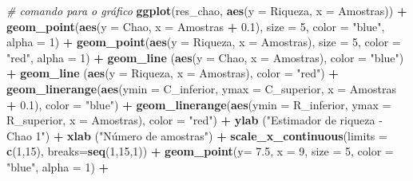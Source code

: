 \documentclass[
]{book}
\newenvironment{Shaded}{\begin{snugshade}}{\end{snugshade}}
\newcommand{\CommentTok}[1]{\textcolor[rgb]{0.56,0.35,0.01}{\textit{#1}}}
\newcommand{\DataTypeTok}[1]{\textcolor[rgb]{0.13,0.29,0.53}{#1}}
\newcommand{\DecValTok}[1]{\textcolor[rgb]{0.00,0.00,0.81}{#1}}
\newcommand{\FloatTok}[1]{\textcolor[rgb]{0.00,0.00,0.81}{#1}}
\newcommand{\KeywordTok}[1]{\textcolor[rgb]{0.13,0.29,0.53}{\textbf{#1}}}
\newcommand{\NormalTok}[1]{#1}
\newcommand{\OperatorTok}[1]{\textcolor[rgb]{0.81,0.36,0.00}{\textbf{#1}}}
\newcommand{\StringTok}[1]{\textcolor[rgb]{0.31,0.60,0.02}{#1}}
\begin{document}
\begin{Shaded}
\begin{Highlighting}[]
\CommentTok{# comando para o gráfico}
\KeywordTok{ggplot}\NormalTok{(res_chao, }\KeywordTok{aes}\NormalTok{(}\DataTypeTok{y =}\NormalTok{ Riqueza, }\DataTypeTok{x =}\NormalTok{ Amostras)) }\OperatorTok{+}
\StringTok{  }\KeywordTok{geom_point}\NormalTok{(}\KeywordTok{aes}\NormalTok{(}\DataTypeTok{y =}\NormalTok{ Chao, }\DataTypeTok{x =}\NormalTok{ Amostras }\OperatorTok{+}\StringTok{ }\FloatTok{0.1}\NormalTok{), }\DataTypeTok{size =} \DecValTok{5}\NormalTok{, }\DataTypeTok{color =} \StringTok{"blue"}\NormalTok{, }\DataTypeTok{alpha =} \DecValTok{1}\NormalTok{) }\OperatorTok{+}
\StringTok{  }\KeywordTok{geom_point}\NormalTok{(}\KeywordTok{aes}\NormalTok{(}\DataTypeTok{y =}\NormalTok{ Riqueza, }\DataTypeTok{x =}\NormalTok{ Amostras), }\DataTypeTok{size =} \DecValTok{5}\NormalTok{, }\DataTypeTok{color =} \StringTok{"red"}\NormalTok{, }\DataTypeTok{alpha =} \DecValTok{1}\NormalTok{) }\OperatorTok{+}
\StringTok{  }\KeywordTok{geom_line}\NormalTok{ (}\KeywordTok{aes}\NormalTok{(}\DataTypeTok{y =}\NormalTok{ Chao, }\DataTypeTok{x =}\NormalTok{ Amostras), }\DataTypeTok{color =} \StringTok{"blue"}\NormalTok{) }\OperatorTok{+}
\StringTok{  }\KeywordTok{geom_line}\NormalTok{ (}\KeywordTok{aes}\NormalTok{(}\DataTypeTok{y =}\NormalTok{ Riqueza, }\DataTypeTok{x =}\NormalTok{ Amostras), }\DataTypeTok{color =} \StringTok{"red"}\NormalTok{) }\OperatorTok{+}
\StringTok{  }\KeywordTok{geom_linerange}\NormalTok{(}\KeywordTok{aes}\NormalTok{(}\DataTypeTok{ymin =}\NormalTok{ C_inferior, }\DataTypeTok{ymax =}\NormalTok{ C_superior, }\DataTypeTok{x =}\NormalTok{ Amostras }\OperatorTok{+}\StringTok{ }\FloatTok{0.1}\NormalTok{),}
 \DataTypeTok{color =} \StringTok{"blue"}\NormalTok{) }\OperatorTok{+}
\StringTok{  }\KeywordTok{geom_linerange}\NormalTok{(}\KeywordTok{aes}\NormalTok{(}\DataTypeTok{ymin =}\NormalTok{ R_inferior, }\DataTypeTok{ymax =}\NormalTok{ R_superior, }\DataTypeTok{x =}\NormalTok{ Amostras), }\DataTypeTok{color =} \StringTok{"red"}\NormalTok{) }\OperatorTok{+}
\StringTok{  }\KeywordTok{ylab}\NormalTok{ (}\StringTok{"Estimador de riqueza - Chao 1"}\NormalTok{) }\OperatorTok{+}
\StringTok{  }\KeywordTok{xlab}\NormalTok{ (}\StringTok{"Número de amostras"}\NormalTok{) }\OperatorTok{+}
\StringTok{  }\KeywordTok{scale_x_continuous}\NormalTok{(}\DataTypeTok{limits =} \KeywordTok{c}\NormalTok{(}\DecValTok{1}\NormalTok{,}\DecValTok{15}\NormalTok{), }\DataTypeTok{breaks=}\KeywordTok{seq}\NormalTok{(}\DecValTok{1}\NormalTok{,}\DecValTok{15}\NormalTok{,}\DecValTok{1}\NormalTok{)) }\OperatorTok{+}
\StringTok{  }\KeywordTok{geom_point}\NormalTok{(}\DataTypeTok{y=} \FloatTok{7.5}\NormalTok{, }\DataTypeTok{x =} \DecValTok{9}\NormalTok{, }\DataTypeTok{size =} \DecValTok{5}\NormalTok{, }\DataTypeTok{color =} \StringTok{"blue"}\NormalTok{, }\DataTypeTok{alpha =} \DecValTok{1}\NormalTok{) }\OperatorTok{+}\StringTok{ }

\end{Highlighting}
\end{Shaded}
\end{document}
